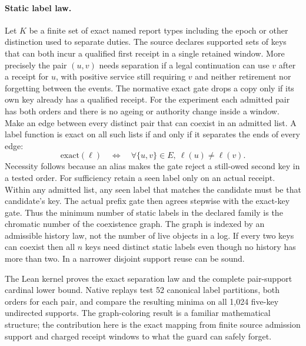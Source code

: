 \documentclass{article}
\begin{document}
\paragraph{Static label law.}
Let $K$ be a finite set of exact named report types including
the epoch or other distinction used to separate duties. The
source declares supported sets of keys that can both incur a
qualified first receipt in a single retained window. More
precisely the pair $(u,v)$ needs separation if a legal continuation
can use $v$ after a receipt for $u$, with positive service still
requiring $v$ and neither retirement nor forgetting between the
events. The normative exact gate drops a copy only if its own key
already has a qualified receipt.
For the experiment each admitted pair has both orders and there is
no ageing or authority change inside a window. Make an edge between
every distinct pair that can coexist in an admitted list. A label
function is exact on all such lists if and only if it separates
the ends of every edge:
\[
             \mathrm{exact}(\ell)\quad\Longleftrightarrow\quad
             \forall\{u,v\}\in E,\ \ell(u)\ne\ell(v).
\]
Necessity follows because an alias makes the gate reject a still-owed
second key in a tested order. For sufficiency retain a seen label
only on an actual receipt. Within any admitted list, any seen label
that matches the candidate must be that candidate's key. The actual
prefix gate then agrees stepwise with the exact-key gate.
Thus the minimum number of static labels in the declared family
is the chromatic number of the coexistence graph. The graph is
indexed by an admissible history law, not the number of live
objects in a log. If every two keys can coexist then all $n$ keys
need distinct static labels even though no history has more than
two. In a narrower disjoint support reuse can be sound.

The Lean kernel proves the exact separation law and the complete
pair-support cardinal lower bound. Native replays test 52 canonical
label partitions, both orders for each pair, and compare the
resulting minima on all 1,024 five-key undirected supports.
The graph-coloring result is a familiar mathematical structure;
the contribution here is the exact mapping from finite source
admission support and charged receipt windows to what the guard
can safely forget.
\end{document}
